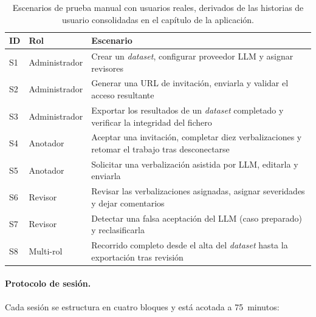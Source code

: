 \begin{table}[ht]
	\centering
	\small
	\begin{tabular}{llp{6.0cm}}
		\hline
		\textbf{ID} & \textbf{Rol}   & \textbf{Escenario}                                                                                  \\
		\hline
		S1          & Administrador  & Crear un \textit{dataset}, configurar proveedor LLM y asignar revisores                             \\
		S2          & Administrador  & Generar una URL de invitación, enviarla y validar el acceso resultante                              \\
		S3          & Administrador  & Exportar los resultados de un \textit{dataset} completado y verificar la integridad del fichero     \\
		S4          & Anotador       & Aceptar una invitación, completar diez verbalizaciones y retomar el trabajo tras desconectarse      \\
		S5          & Anotador       & Solicitar una verbalización asistida por LLM, editarla y enviarla                                   \\
		S6          & Revisor        & Revisar las verbalizaciones asignadas, asignar severidades y dejar comentarios                      \\
		S7          & Revisor        & Detectar una falsa aceptación del LLM (caso preparado) y reclasificarla                             \\
		S8          & Multi-rol      & Recorrido completo desde el alta del \textit{dataset} hasta la exportación tras revisión            \\
		\hline
	\end{tabular}
	\caption{Escenarios de prueba manual con usuarios reales, derivados de las
		historias de usuario consolidadas en el capítulo de la aplicación.}
	\label{tab:escenarios-usuarios-reales}
\end{table}

\paragraph{Protocolo de sesión.} Cada sesión se estructura en cuatro bloques y
está acotada a 75~minutos:

